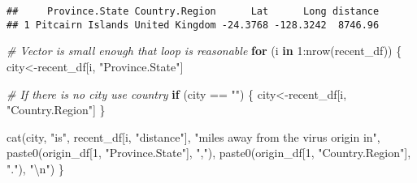 \documentclass[
]{article}
\newenvironment{Shaded}{\begin{snugshade}}{\end{snugshade}}
\newcommand{\CommentTok}[1]{\textcolor[rgb]{0.56,0.35,0.01}{\textit{#1}}}
\newcommand{\ControlFlowTok}[1]{\textcolor[rgb]{0.13,0.29,0.53}{\textbf{#1}}}
\newcommand{\DecValTok}[1]{\textcolor[rgb]{0.00,0.00,0.81}{#1}}
\newcommand{\FloatTok}[1]{\textcolor[rgb]{0.00,0.00,0.81}{#1}}
\newcommand{\FunctionTok}[1]{\textcolor[rgb]{0.00,0.00,0.00}{#1}}
\newcommand{\NormalTok}[1]{#1}
\newcommand{\OtherTok}[1]{\textcolor[rgb]{0.56,0.35,0.01}{#1}}
\newcommand{\SpecialCharTok}[1]{\textcolor[rgb]{0.00,0.00,0.00}{#1}}
\newcommand{\StringTok}[1]{\textcolor[rgb]{0.31,0.60,0.02}{#1}}
\begin{document}
\begin{Shaded}
\end{Shaded}

\begin{verbatim}
##     Province.State Country.Region      Lat      Long distance
## 1 Pitcairn Islands United Kingdom -24.3768 -128.3242  8746.96
\end{verbatim}

\begin{Shaded}
\begin{Highlighting}[]
\CommentTok{\# Vector is small enough that loop is reasonable}
\ControlFlowTok{for}\NormalTok{ (i }\ControlFlowTok{in} \DecValTok{1}\SpecialCharTok{:}\FunctionTok{nrow}\NormalTok{(recent\_df)) \{}
\NormalTok{  city}\OtherTok{\textless{}{-}}\NormalTok{recent\_df[i, }\StringTok{"Province.State"}\NormalTok{]}
  
  \CommentTok{\# If there is no city use country}
  \ControlFlowTok{if}\NormalTok{ (city }\SpecialCharTok{==} \StringTok{""}\NormalTok{) \{}
\NormalTok{    city}\OtherTok{\textless{}{-}}\NormalTok{recent\_df[i, }\StringTok{"Country.Region"}\NormalTok{]}
\NormalTok{  \}}
  
  \FunctionTok{cat}\NormalTok{(city, }\StringTok{"is"}\NormalTok{, recent\_df[i, }\StringTok{"distance"}\NormalTok{], }
      \StringTok{"miles away from the virus origin in"}\NormalTok{, }
      \FunctionTok{paste0}\NormalTok{(origin\_df[}\DecValTok{1}\NormalTok{, }\StringTok{"Province.State"}\NormalTok{], }\StringTok{","}\NormalTok{), }
      \FunctionTok{paste0}\NormalTok{(origin\_df[}\DecValTok{1}\NormalTok{, }\StringTok{"Country.Region"}\NormalTok{], }\StringTok{"."}\NormalTok{), }\StringTok{"}\SpecialCharTok{\textbackslash{}n}\StringTok{"}\NormalTok{)}
\NormalTok{\}}
\end{Highlighting}
\end{Shaded}
\end{document}
